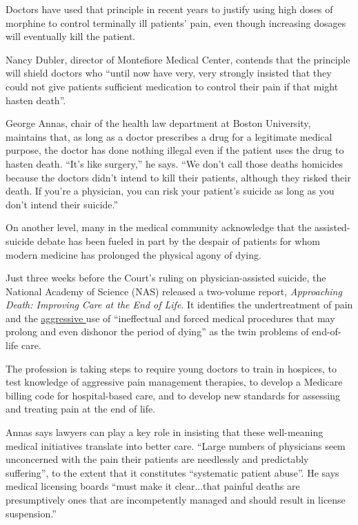 \documentclass[UTF8,11pt]{ctexart}
\begin{document}
Doctors have used that principle in recent years to justify using high doses of morphine to control terminally ill patients’ pain, even though increasing dosages will eventually kill the patient.


Nancy Dubler, director of Montefiore Medical Center, contends that the principle will shield doctors who “until now have very, very strongly insisted that they could not give patients sufficient medication to control their pain if that might hasten death”.


George Annas, chair of the health law department at Boston University, maintains that, as long as a doctor prescribes a drug for a legitimate medical purpose, the doctor has done nothing illegal even if the patient uses the drug to hasten death. “It’s like surgery,” he says. “We don’t call those deaths homicides because the doctors didn’t intend to kill their patients, although they risked their death. If you’re a physician, you can risk your patient’s suicide as long as you don’t intend their suicide.”


On another level, many in the medical community acknowledge that the assisted-suicide debate has been fueled in part by the despair of patients for whom modern medicine has prolonged the physical agony of dying.


Just three weeks before the Court’s ruling on physician-assisted suicide, the National Academy of Science (NAS) released a two-volume report, \textit{Approaching Death: Improving} \textit{Care at the End of Life}. It identifies the undertreatment of pain and the \uline{aggressive }use of “ineffectual and forced medical procedures that may prolong and even dishonor the period of dying” as the twin problems of end-of-life care.


The profession is taking steps to require young doctors to train in hospices, to test knowledge of aggressive pain management therapies, to develop a Medicare billing code for hospital-based care, and to develop new standards for assessing and treating pain at the end of life.


Annas says lawyers can play a key role in insisting that these well-meaning medical initiatives translate into better care. “Large numbers of physicians seem unconcerned with the pain their patients are needlessly and predictably suffering”, to the extent that it constitutes “systematic patient abuse”. He says medical licensing boards “must make it clear...that painful deaths are presumptively ones that are incompetently managed and should result in license suspension.”
\end{document}
